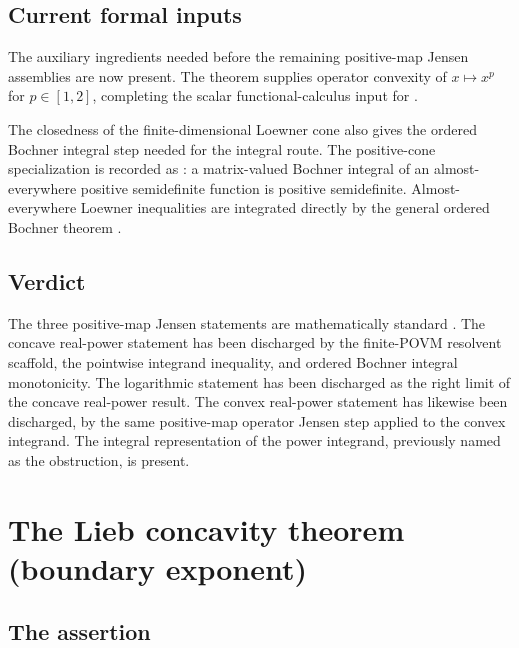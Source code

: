 \documentclass{article}
\begin{document}
\subsection{Current formal inputs}\label{ssec:formal-inputs}

The auxiliary ingredients needed before the remaining positive-map Jensen
assemblies are now present.  The theorem  supplies operator
convexity of $x\mapsto x^p$ for $p\in[1,2]$, completing the scalar
functional-calculus input for .

The closedness of the finite-dimensional Loewner cone also gives the ordered
Bochner integral step needed for the integral route.  The positive-cone
specialization is recorded as
: a matrix-valued
Bochner integral of an almost-everywhere positive semidefinite function is
positive semidefinite.  Almost-everywhere Loewner inequalities are integrated
directly by the general ordered Bochner theorem .

\subsection{Verdict}

The three positive-map Jensen statements are mathematically standard
\cite[Theorems~5.10--5.13 and Corollary~5.2]{Wolf2012Quantum}.  The concave
real-power statement  has been discharged by
the finite-POVM resolvent scaffold, the pointwise integrand inequality, and
ordered Bochner integral monotonicity.  The logarithmic statement
 has been discharged as the right limit of the
concave real-power result.  The convex real-power statement
 has likewise been discharged, by the same
positive-map operator Jensen step applied to the convex integrand.
The integral representation of the power integrand, previously named as the
obstruction, is present.

\section{The Lieb concavity theorem (boundary exponent)}\label{sec:lieb}

\subsection{The assertion}
\end{document}
